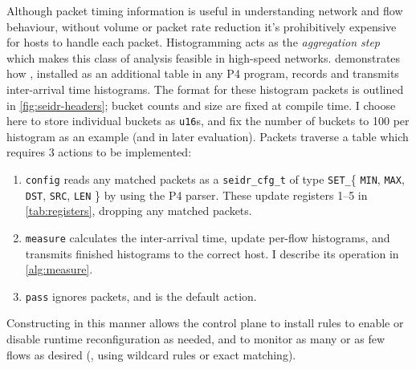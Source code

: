 Although packet timing information is useful in understanding network and flow behaviour, without volume or packet rate reduction it's prohibitively expensive for hosts to handle each packet.
Histogramming acts as the \emph{aggregation step} which makes this class of analysis feasible in high-speed networks.
 demonstrates how \seidr{}, installed as an additional table in any P4 program, records and transmits inter-arrival time histograms.
The format for these histogram packets is outlined in \cref{fig:seidr-headers}; bucket counts and size are fixed at compile time.
I choose here to store individual buckets as \texttt{u16}s, and fix the number of buckets to \num{100} per histogram as an example (and in later evaluation).
Packets traverse a table which requires \num{3} actions to be implemented:
\begin{enumerate}
    \item \texttt{config} reads any matched packets as a \texttt{seidr\_cfg\_t} of type \texttt{SET\_}\{ \texttt{MIN}, \texttt{MAX}, \texttt{DST}, \texttt{SRC}, \texttt{LEN} \} by using the P4 parser.
    These update registers \numrange{1}{5} in \cref{tab:registers}, dropping any matched packets.
    
    \item \texttt{measure} calculates the inter-arrival time, update per-flow histograms, and transmits finished histograms to the correct host. I describe its operation in \cref{alg:measure}.
    
    \item \texttt{pass} ignores packets, and is the default action.
\end{enumerate}
Constructing \seidr{} in this manner allows the control plane to install rules to enable or disable runtime reconfiguration as needed, and to monitor as many or as few flows as desired (\ie, using wildcard rules or exact matching).

